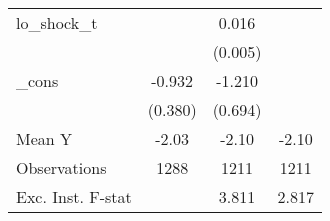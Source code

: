 {\begin{tabular}{l*{3}{c}}
\addlinespace
lo\_shock\_t  &                     &       0.016\sym{***}&                     \\
            &                     &     (0.005)         &                     \\
\addlinespace
\_cons      &      -0.932\sym{**} &      -1.210\sym{*}  &                     \\
            &     (0.380)         &     (0.694)         &                     \\
\midrule
Mean Y      &       -2.03         &       -2.10         &       -2.10         \\
Observations&        1288         &        1211         &        1211         \\
Exc. Inst. F-stat&                     &       3.811         &       2.817         \\
\bottomrule
\end{tabular}
}
